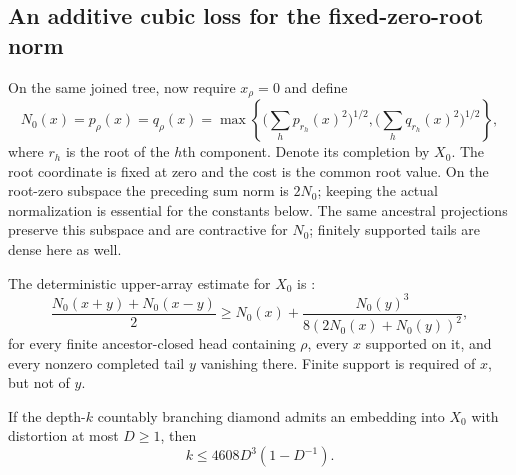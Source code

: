 \subsection{An additive cubic loss for the fixed-zero-root norm}

On the same joined tree, now require $x_\rho=0$ and define
\[
 N_0(x)=p_\rho(x)=q_\rho(x)
 =\max\left\{
       \Big(\sum_h p_{r_h}(x)^2\Big)^{1/2},
       \Big(\sum_h q_{r_h}(x)^2\Big)^{1/2}\right\},
\]
where $r_h$ is the root of the $h$th component.  Denote its
completion by $X_0$.  The root coordinate is fixed at zero and the
cost is the common root value.  On the root-zero subspace the
preceding sum norm is $2N_0$; keeping the actual normalization is
essential for the constants below.
The same ancestral projections preserve this subspace and are
contractive for $N_0$; finitely supported tails are dense here as well.

The deterministic upper-array estimate for $X_0$ is
\cite[Theorem~2.1, equation~(2.4)]{RecursivePotentials}:
\begin{equation}\label{met:f:zero-input}
 \frac{N_0(x+y)+N_0(x-y)}2
 \ge N_0(x)+\frac{N_0(y)^3}{8(2N_0(x)+N_0(y))^2},
\end{equation}
for every finite ancestor-closed head containing $\rho$, every $x$
supported on it, and every nonzero completed tail $y$ vanishing
there.  Finite support is required of $x$, but not of $y$.

\begin{proposition}\label{met:f:zero}
If the depth-$k$ countably branching diamond admits an embedding into
$X_0$ with distortion at most $D\ge1$, then
\begin{equation}\label{met:f:zero-depth}
 k\le4608D^3(1-D^{-1}).
\end{equation}
\end{proposition}

